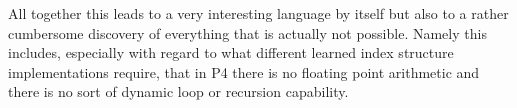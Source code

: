 All together this leads to a very interesting language by itself but also to a rather cumbersome discovery of everything that is actually not possible. Namely this includes, especially with regard to what different learned index structure implementations require, that in P4 there is no floating point arithmetic and there is no sort of dynamic loop or recursion capability.
